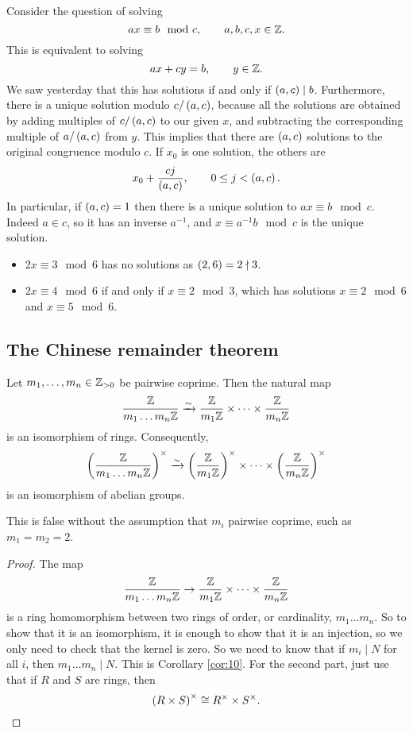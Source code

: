 Consider the question of solving
$$ ax \equiv b \mod c, \qquad a, b, c, x \in \mathbb{Z}. $$
This is equivalent to solving
$$ ax + cy = b, \qquad y \in \mathbb{Z}. $$
We saw yesterday that this has solutions if and only if $ \br{a, c} \mid b $. Furthermore, there is a unique solution modulo $ c / \br{a, c} $, because all the solutions are obtained by adding multiples of $ c / \br{a, c} $ to our given $ x $, and subtracting the corresponding multiple of $ a / \br{a, c} $ from $ y $. This implies that there are $ \br{a, c} $ solutions to the original congruence modulo $ c $. If $ x_0 $ is one solution, the others are
$$ x_0 + \dfrac{cj}{\br{a, c}}, \qquad 0 \le j < \br{a, c}. $$
In particular, if $ \br{a, c} = 1 $ then there is a unique solution to $ ax \equiv b \mod c $. Indeed $ a \in \unit{c} $, so it has an inverse $ a^{-1} $, and $ x \equiv a^{-1}b \mod c $ is the unique solution.

\begin{example*}
\hfill
\begin{itemize}
\item $ 2x \equiv 3 \mod 6 $ has no solutions as $ \br{2, 6} = 2 \nmid 3 $.
\item $ 2x \equiv 4 \mod 6 $ if and only if $ x \equiv 2 \mod 3 $, which has solutions $ x \equiv 2 \mod 6 $ and $ x \equiv 5 \mod 6 $.
\end{itemize}
\end{example*}

\subsection{The Chinese remainder theorem}

\begin{theorem}
\label{thm:14}
Let $ m_1, \dots, m_n \in \mathbb{Z}_{> 0} $ be pairwise coprime. Then the natural map
$$ \dfrac{\mathbb{Z}}{m_1 \dots m_n\mathbb{Z}} \xrightarrow{\sim} \dfrac{\mathbb{Z}}{m_1\mathbb{Z}} \times \dots \times \dfrac{\mathbb{Z}}{m_n\mathbb{Z}} $$
is an isomorphism of rings. Consequently,
$$ \Unit{m_1 \dots m_n} \xrightarrow{\sim} \Unit{m_1} \times \dots \times \Unit{m_n} $$
is an isomorphism of abelian groups.
\end{theorem}

\begin{remark*}
This is false without the assumption that $ m_i $ pairwise coprime, such as $ m_1 = m_2 = 2 $.
\end{remark*}

\begin{proof}
The map
$$ \dfrac{\mathbb{Z}}{m_1 \dots m_n\mathbb{Z}} \to \dfrac{\mathbb{Z}}{m_1\mathbb{Z}} \times \dots \times \dfrac{\mathbb{Z}}{m_n\mathbb{Z}} $$
is a ring homomorphism between two rings of order, or cardinality, $ m_1 \dots m_n $. So to show that it is an isomorphism, it is enough to show that it is an injection, so we only need to check that the kernel is zero. So we need to know that if $ m_i \mid N $ for all $ i $, then $ m_1 \dots m_n \mid N $. This is Corollary \ref{cor:10}. For the second part, just use that if $ R $ and $ S $ are rings, then
$$ \br{R \times S}^\times \cong R^\times \times S^\times. $$
\end{proof}

